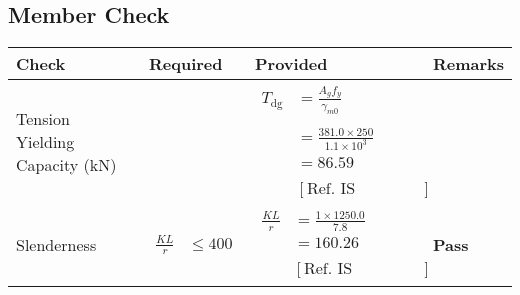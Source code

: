 \documentclass{article}%
\begin{document}
\subsection{Member Check}%
\label{subsec:MemberCheck}%
\renewcommand{\arraystretch}{1.2}%
\begin{longtable}{|p{2.5cm}|p{4.5cm}|p{7cm}|p{1.5cm}|}%
\hline%
\rowcolor{OsdagGreen}%
Check&Required&Provided&Remarks\\%
\hline%
\endhead%
\hline%
Tension Yielding Capacity (kN)&&$\begin{aligned} T_{\text{dg}} &= \frac{A_g f_y}{\gamma_{m0}}\\ \\ &=\frac{381.0\times250}{1.1\times 10^3}\\ &=86.59\\ \\ & [\text{Ref. IS 800:2007, Cl.6.2}] \end{aligned}$&\textcolor{OsdagGreen}{ 
\textbf{}
}\\%
\hline%
Slenderness&$\begin{aligned}\frac{K L}{r} &\leq 400\end{aligned}$&$\begin{aligned}\frac{K L}{r} &= \frac{1\times1250.0}{7.8}\\ &= 160.26\\ \\ & [\text{Ref. IS 800:2007, Cl.7.1.2}] \end{aligned}$&\textcolor{OsdagGreen}{ 
\textbf{Pass}
}\\%
\hline%
\end{longtable}

%
\end{document}
